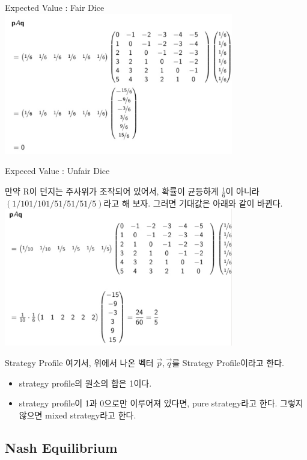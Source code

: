 \documentclass{beamer}
\begin{document}
\begin{frame}{Expected Value : Fair Dice}
\includegraphics[width=10cm,keepaspectratio]{fair}
\end{frame} 


\begin{frame}{Expeced Value : Unfair Dice}

만약 R이 던지는 주사위가 조작되어 있어서, 확률이 균등하게 $\frac{1}{6}$이 아니라 $(1/10 1/10 1/5 1/5 1/5 1/5)$라고 해 보자. 그러면 기대값은 아래와 같이 바뀐다. 
\includegraphics[width=10cm,keepaspectratio]{unfair}

\end{frame} 


\begin{frame}{Strategy Profile}
여기서, 위에서 나온 벡터 $\vec{p}, \vec{q}$를 Strategy Profile이라고 한다. 

\begin{itemize} 
\item strategy profile의 원소의 합은 1이다. 
\item  strategy profile이 1과 0으로만 이루어져 있다면, pure strategy라고 한다. 그렇지 않으면 mixed strategy라고 한다. 
\end{itemize}

\end{frame} 


\subsection{Nash Equilibrium} 
\end{document}
